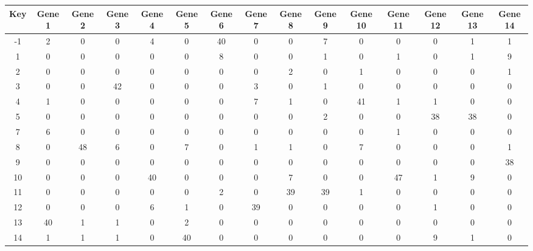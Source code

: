 \begin{tabular}{|c|c|c|c|c|c|c|c|c|c|c|c|c|c|c|}
\hline
Key & Gene 1 & Gene 2 & Gene 3 & Gene 4 & Gene 5 & Gene 6 & Gene 7 & Gene 8 & Gene 9 & Gene 10 & Gene 11 & Gene 12 & Gene 13 & Gene 14 \\
\hline
-1 & 2 & 0 & 0 & 4 & 0 & 40 & 0 & 0 & 7 & 0 & 0 & 0 & 1 & 1 \\
1 & 0 & 0 & 0 & 0 & 0 & 8 & 0 & 0 & 1 & 0 & 1 & 0 & 1 & 9 \\
2 & 0 & 0 & 0 & 0 & 0 & 0 & 0 & 2 & 0 & 1 & 0 & 0 & 0 & 1 \\
3 & 0 & 0 & 42 & 0 & 0 & 0 & 3 & 0 & 1 & 0 & 0 & 0 & 0 & 0 \\
4 & 1 & 0 & 0 & 0 & 0 & 0 & 7 & 1 & 0 & 41 & 1 & 1 & 0 & 0 \\
5 & 0 & 0 & 0 & 0 & 0 & 0 & 0 & 0 & 2 & 0 & 0 & 38 & 38 & 0 \\
7 & 6 & 0 & 0 & 0 & 0 & 0 & 0 & 0 & 0 & 0 & 1 & 0 & 0 & 0 \\
8 & 0 & 48 & 6 & 0 & 7 & 0 & 1 & 1 & 0 & 7 & 0 & 0 & 0 & 1 \\
9 & 0 & 0 & 0 & 0 & 0 & 0 & 0 & 0 & 0 & 0 & 0 & 0 & 0 & 38 \\
10 & 0 & 0 & 0 & 40 & 0 & 0 & 0 & 7 & 0 & 0 & 47 & 1 & 9 & 0 \\
11 & 0 & 0 & 0 & 0 & 0 & 2 & 0 & 39 & 39 & 1 & 0 & 0 & 0 & 0 \\
12 & 0 & 0 & 0 & 6 & 1 & 0 & 39 & 0 & 0 & 0 & 0 & 1 & 0 & 0 \\
13 & 40 & 1 & 1 & 0 & 2 & 0 & 0 & 0 & 0 & 0 & 0 & 0 & 0 & 0 \\
14 & 1 & 1 & 1 & 0 & 40 & 0 & 0 & 0 & 0 & 0 & 0 & 9 & 1 & 0 \\
\hline
\end{tabular}
